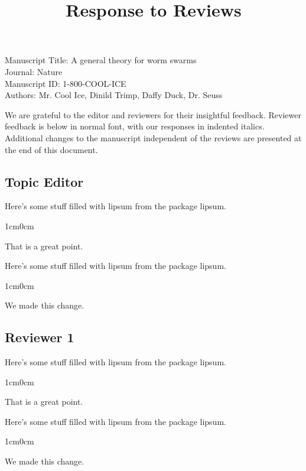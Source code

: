 \documentclass{article}
\title{Response to Reviews}
\newenvironment{response}
	{
	\begin{adjustwidth}{1cm}{0cm}
	\itshape %
	}
	{
	\end{adjustwidth}
	}
\begin{document}
\maketitle


\noindent
{\large
Manuscript Title: 
A general theory for worm swarms
\\
Journal: 
Nature
\\
Manuscript ID: 
1-800-COOL-ICE
\\
Authors: Mr. Cool Ice, Dinild Trimp, Daffy Duck, Dr. Seuss
\\
}

We are grateful to the editor and reviewers for their insightful feedback. 
Reviewer feedback is below in normal font, with our responses in indented italics. 
Additional changes to the manuscript independent of the reviews are presented at the end of this document.

\subsection*{Topic Editor}
Here's some stuff filled with lipsum from the package lipsum. \lipsum[2]
\begin{response}
  That is a great point. \\
\end{response}


Here's some stuff filled with lipsum from the package lipsum. \lipsum[2]

\begin{response}
  We made this change. \\
\end{response}


\subsection*{Reviewer 1}
Here's some stuff filled with lipsum from the package lipsum. \lipsum[2]
\begin{response}
  That is a great point. \\
\end{response}

Here's some stuff filled with lipsum from the package lipsum. \lipsum[2]

\begin{response}
  We made this change. \\
\end{response}
\end{document}

